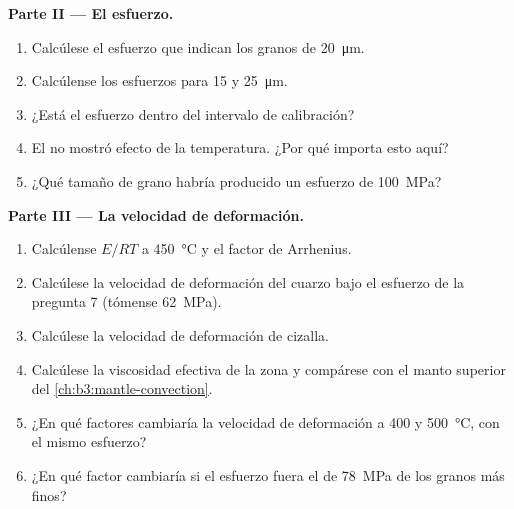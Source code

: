 \begin{problem}
\medskip\noindent\textbf{Parte II --- El esfuerzo.}
\begin{enumerate}[resume]
  \item Calcúlese el esfuerzo que indican los granos de \qty{20}{\micro m}.
  \item Calcúlense los esfuerzos para 15 y \qty{25}{\micro m}.
  \item ¿Está el esfuerzo dentro del intervalo de calibración?
  \item El  no mostró efecto de la temperatura. ¿Por qué importa
        esto aquí?
  \item ¿Qué tamaño de grano habría producido un esfuerzo de \qty{100}{MPa}?
\end{enumerate}

\medskip\noindent\textbf{Parte III --- La velocidad de deformación.}
\begin{enumerate}[resume]
  \item Calcúlense $E/RT$ a \qty{450}{\celsius} y el factor de Arrhenius.
  \item Calcúlese la velocidad de deformación del cuarzo bajo el esfuerzo de la pregunta 7
        (tómense \qty{62}{MPa}).
  \item Calcúlese la velocidad de deformación de cizalla.
  \item Calcúlese la viscosidad efectiva de la zona y compárese con el
        manto superior del \cref{ch:b3:mantle-convection}.
  \item ¿En qué factores cambiaría la velocidad de deformación a 400 y
        \qty{500}{\celsius}, con el mismo esfuerzo?
  \item ¿En qué factor cambiaría si el esfuerzo fuera el de \qty{78}{MPa} de los
        granos más finos?
\end{enumerate}


\end{problem}
